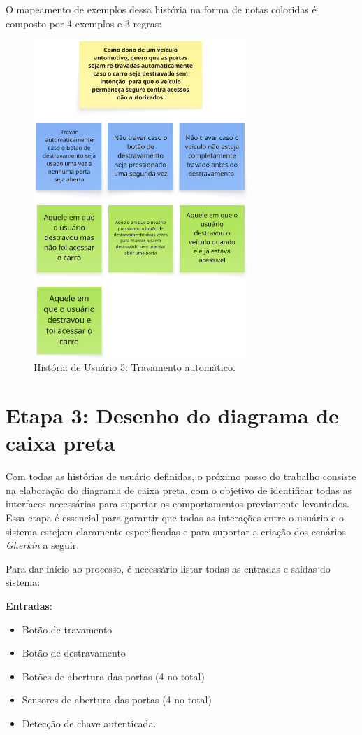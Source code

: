 O mapeamento de exemplos dessa história na forma de notas coloridas é composto por 4 exemplos e 3 regras:

\begin{figure}[H]
\centering
\includegraphics[height=12cm]{figuras/user_story_5.png}
\caption{História de Usuário 5: Travamento automático.}
\label{fig:historia5}
\end{figure}

\section{\textbf{Etapa 3: Desenho do diagrama de caixa preta}}
\label{sbs:etapa3}
Com todas as histórias de usuário definidas, o próximo passo do trabalho consiste na elaboração do diagrama de caixa preta, com o objetivo de identificar todas as 
interfaces necessárias para suportar os comportamentos previamente levantados. Essa etapa é essencial para garantir que todas as interações entre o usuário e o 
sistema estejam claramente especificadas e para suportar a criação dos cenários \textit{Gherkin} a seguir.

Para dar início ao processo, é necessário listar todas as entradas e saídas do sistema:

\textbf{Entradas}:

\begin{itemize}
    \item Botão de travamento
    \item Botão de destravamento
    \item Botões de abertura das portas (4 no total)
    \item Sensores de abertura das portas (4 no total)
    \item Detecção de chave autenticada.
\end{itemize}

